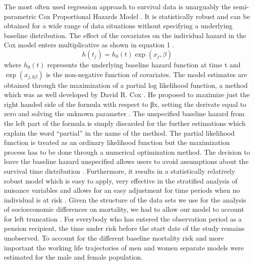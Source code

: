 \documentclass[a4paper,10pt,oneside,english]{article}
\begin{document}
The most often used regression approach to survival data is unarguably the semi-parametric Cox Proportional Hazards Model \citep{mills2011introducing}. It is statistically robust and can be obtained for a wide range of data situations without specifying a underlying baseline distribution. The effect of the covariates on the individual hazard in the Cox model enters multiplicative as shown in equation 1 \citep{kleinbaum2010survival}.
\begin{equation}
h(t_j)=h_0 (t) \exp(x_j,\beta)
\end{equation}
where $h_0(t)$ represents the underlying baseline hazard function at time t and $\exp(x_{j,ß\beta})$ is the non-negative function of covariates. The model estimates are obtained through the maximization of a partial log likelihood function, a method which was as well developed by David R. Cox \citep{allison2014event}. He proposed to maximize just the right handed side of the formula with respect to βx, setting the derivate equal to zero and solving the unknown parameter \citep{Hosmer2011}. The unspecified baseline hazard from the left part of the formula is simply discarded for the further estimations which explain the word “partial” in the name of the method. The partial likelihood function is treated as an ordinary likelihood function but the maximization process has to be done through a numerical optimization method.
The decision to leave the baseline hazard unspecified allows users to avoid assumptions about the survival time distribution \citep{mills2011introducing}. Furthermore, it results in a statistically relatively robust model which is easy to apply, very effective in the stratified analysis of nuisance variables and allows for an easy adjustment for time periods when no individual is at risk \citep{allison2010survival,therneau2000cox}. Given the structure of the data sets we use for the analysis of socioeconomic differences on mortality, we had to allow our model to account for left truncation  \citep{cain2011bias}. For everybody who has entered the observation period as a pension recipient, the time under risk before the start date of the study remains unobserved. To account for the different baseline mortality risk and more important the working life trajectories of men and women separate models were estimated for the male and female population.
\end{document}
